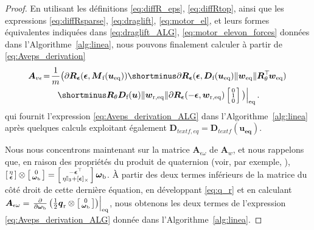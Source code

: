 \begin{proof}
En utilisant les définitions \eqref{eq:diffR_eps}, \eqref{eq:diffRtop}, ainsi que les expressions \eqref{eq:diffRsparse}, \eqref{eq:draglift}, \eqref{eq:motor_el}, et leurs formes équivalentes indiquées dans \eqref{eq:draglift_ALG}, \eqref{eq:motor_elevon_forces} données dans l'Algorithme~\ref{alg:linea}, nous pouvons finalement calculer à partir de \eqref{eq:Aveps_derivation}
\begin{multline*}
    \!\boldsymbol{A}_{v\epsilon} \!=\! \frac{1}{m} \big( \partial \boldsymbol{R}_{\boldsymbol{ \epsilon}} (\boldsymbol{ \epsilon} , \boldsymbol{M}_{\text{f}}(\boldsymbol{u_{\text{eq}}}))  \shortminus \partial \boldsymbol{R}_{\boldsymbol{ \epsilon}} ( \boldsymbol{ \epsilon} ,\boldsymbol{D}_{\text{f}}(\boldsymbol{u_{\text{eq}}})  \lVert \boldsymbol{w}_{\mathrm{eq}} \rVert  \boldsymbol{R}_\theta^\top \! \boldsymbol{w}_{\mathrm{eq}})  \\    \left. \shortminus  \boldsymbol{R}_\theta \boldsymbol{D}_{\text{f}}(\boldsymbol{u})  \lVert \boldsymbol{w}_{\mathrm{r,eq}} \rVert \partial \boldsymbol{R}_{\boldsymbol{ \epsilon}}( -\boldsymbol{ \epsilon}, \boldsymbol{w}_{\mathrm{r,eq}})\smallmat{0\\ 1\\ 0} \big)\right|_{\mathrm{eq}}.
\end{multline*}
qui fournit l'expression \eqref{eq:Aveps_derivation_ALG} dans l'Algorithme~\ref{alg:linea} après quelques calculs exploitant également $\boldsymbol{D}_{text{f,eq}} = \boldsymbol{D}_{text{f}}(\boldsymbol{u_{\text{eq}}})$.

Nous nous concentrons maintenant sur la matrice $\boldsymbol{A}_{\epsilon \omega}$ de  $\boldsymbol{A}_{w}$, et nous rappelons que, en raison des propriétés du produit de quaternion (voir, par exemple, \cite{hamel_minhduc}), 
$\left[ \begin{smallmatrix}\eta \\ \boldsymbol{\epsilon} \end{smallmatrix} \right] \otimes \left[ \begin{smallmatrix}0 \\ 
\boldsymbol{\omega}_{\mathrm{b}} \end{smallmatrix} \right] = 
\left[ \begin{smallmatrix} - \boldsymbol{\epsilon}^\top  \\ 
\eta \mathbb{I}_{3}   + [ \boldsymbol{\epsilon}]_{\times} 
 \end{smallmatrix} \right] \boldsymbol{\omega}_{\mathrm{b}}$. 
À partir des deux termes inférieurs de la matrice du côté droit de cette dernière équation, en développant \eqref{eq:q_r}
et en calculant $\boldsymbol{A}_{\epsilon \omega} = \left. \frac{\partial }{\partial \boldsymbol{\omega}_{\text{b}}} \left( \frac{1}{2} \boldsymbol{{q}}_{\text{r}}  \otimes \left[ \begin{smallmatrix}0 \\ \boldsymbol{\omega}_{\text{b}} \end{smallmatrix} \right] \right) \right|_{\mathrm{eq}}$,
nous obtenons les deux termes de l'expression \eqref{eq:Aveps_derivation_ALG} donnée dans l'Algorithme~\ref{alg:linea}.


\end{proof}
